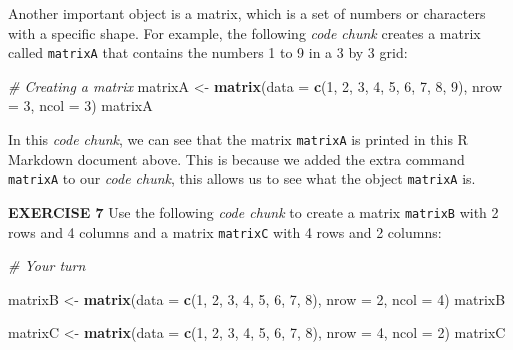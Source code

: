 \documentclass[
]{article}
\newenvironment{Shaded}{\begin{snugshade}}{\end{snugshade}}
\newcommand{\CommentTok}[1]{\textcolor[rgb]{0.56,0.35,0.01}{\textit{#1}}}
\newcommand{\DataTypeTok}[1]{\textcolor[rgb]{0.13,0.29,0.53}{#1}}
\newcommand{\DecValTok}[1]{\textcolor[rgb]{0.00,0.00,0.81}{#1}}
\newcommand{\KeywordTok}[1]{\textcolor[rgb]{0.13,0.29,0.53}{\textbf{#1}}}
\newcommand{\NormalTok}[1]{#1}
\newcommand{\StringTok}[1]{\textcolor[rgb]{0.31,0.60,0.02}{#1}}
\begin{document}
Another important object is a matrix, which is a set of numbers or
characters with a specific shape. For example, the following \emph{code
chunk} creates a matrix called \texttt{matrixA} that contains the
numbers 1 to 9 in a 3 by 3 grid:

\begin{Shaded}
\begin{Highlighting}[]
\CommentTok{# Creating a matrix}
\NormalTok{matrixA <-}\StringTok{ }\KeywordTok{matrix}\NormalTok{(}\DataTypeTok{data =} \KeywordTok{c}\NormalTok{(}\DecValTok{1}\NormalTok{, }\DecValTok{2}\NormalTok{, }\DecValTok{3}\NormalTok{, }\DecValTok{4}\NormalTok{, }\DecValTok{5}\NormalTok{, }\DecValTok{6}\NormalTok{, }\DecValTok{7}\NormalTok{, }\DecValTok{8}\NormalTok{, }\DecValTok{9}\NormalTok{), }
                  \DataTypeTok{nrow =} \DecValTok{3}\NormalTok{, }
                  \DataTypeTok{ncol =} \DecValTok{3}\NormalTok{)}
\NormalTok{matrixA}
\end{Highlighting}
\end{Shaded}

In this \emph{code chunk}, we can see that the matrix \texttt{matrixA}
is printed in this R Markdown document above. This is because we added
the extra command \texttt{matrixA} to our \emph{code chunk}, this allows
us to see what the object \texttt{matrixA} is.

\textbf{EXERCISE 7} Use the following \emph{code chunk} to create a
matrix \texttt{matrixB} with 2 rows and 4 columns and a matrix
\texttt{matrixC} with 4 rows and 2 columns:

\begin{Shaded}
\begin{Highlighting}[]
\CommentTok{# Your turn}

\NormalTok{matrixB <-}\StringTok{ }\KeywordTok{matrix}\NormalTok{(}\DataTypeTok{data =} \KeywordTok{c}\NormalTok{(}\DecValTok{1}\NormalTok{, }\DecValTok{2}\NormalTok{, }\DecValTok{3}\NormalTok{, }\DecValTok{4}\NormalTok{, }\DecValTok{5}\NormalTok{, }\DecValTok{6}\NormalTok{, }\DecValTok{7}\NormalTok{, }\DecValTok{8}\NormalTok{), }
                  \DataTypeTok{nrow =} \DecValTok{2}\NormalTok{, }
                  \DataTypeTok{ncol =} \DecValTok{4}\NormalTok{)}
\NormalTok{matrixB}

\NormalTok{matrixC <-}\StringTok{ }\KeywordTok{matrix}\NormalTok{(}\DataTypeTok{data =} \KeywordTok{c}\NormalTok{(}\DecValTok{1}\NormalTok{, }\DecValTok{2}\NormalTok{, }\DecValTok{3}\NormalTok{, }\DecValTok{4}\NormalTok{, }\DecValTok{5}\NormalTok{, }\DecValTok{6}\NormalTok{, }\DecValTok{7}\NormalTok{, }\DecValTok{8}\NormalTok{), }
                  \DataTypeTok{nrow =} \DecValTok{4}\NormalTok{, }
                  \DataTypeTok{ncol =} \DecValTok{2}\NormalTok{)}
\NormalTok{matrixC}
\end{Highlighting}
\end{Shaded}
\end{document}
